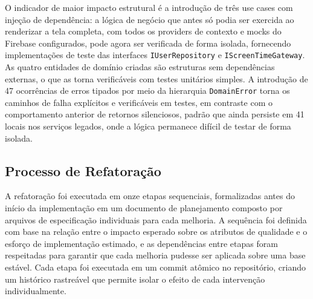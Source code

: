 \documentclass[sigconf,anonymous]{acmart}
\begin{document}
\begin{table}[h]
  \caption{Indicadores de testabilidade coletados nos dois pontos no tempo}
  \label{tab:indicadores-testabilidade}
\end{table}

O indicador de maior impacto estrutural é a introdução de três use cases com injeção de dependência: a lógica de negócio que antes só podia ser exercida ao renderizar a tela completa, com todos os providers de contexto e mocks do Firebase configurados, pode agora ser verificada de forma isolada, fornecendo implementações de teste das interfaces \texttt{IUserRepository} e \texttt{IScreenTimeGateway}. As quatro entidades de domínio criadas são estruturas sem dependências externas, o que as torna verificáveis com testes unitários simples. A introdução de 47 ocorrências de erros tipados por meio da hierarquia \texttt{DomainError} torna os caminhos de falha explícitos e verificáveis em testes, em contraste com o comportamento anterior de retornos silenciosos, padrão que ainda persiste em 41 locais nos serviços legados, onde a lógica permanece difícil de testar de forma isolada.

\subsection{Processo de Refatoração}
\label{sec:processo-refatoracao}

A refatoração foi executada em onze etapas sequenciais, formalizadas antes do início da implementação em um documento de planejamento composto por arquivos de especificação individuais para cada melhoria. A sequência foi definida com base na relação entre o impacto esperado sobre os atributos de qualidade e o esforço de implementação estimado, e as dependências entre etapas foram respeitadas para garantir que cada melhoria pudesse ser aplicada sobre uma base estável. Cada etapa foi executada em um commit atômico no repositório, criando um histórico rastreável que permite isolar o efeito de cada intervenção individualmente.
\end{document}

